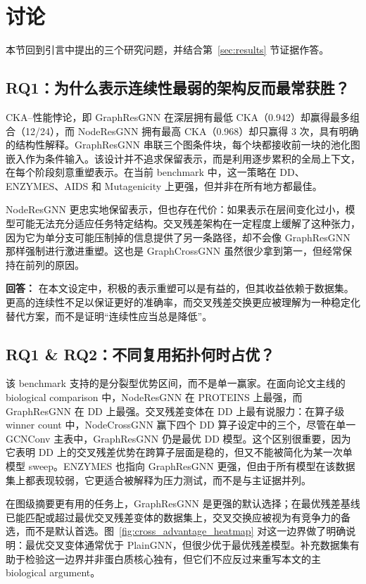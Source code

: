 \section{讨论}

本节回到引言中提出的三个研究问题，并结合第~\ref{sec:results} 节证据作答。

\subsection{RQ1：为什么表示连续性最弱的架构反而最常获胜？}

CKA--性能悖论，即 GraphResGNN 在深层拥有最低 CKA（0.942）却赢得最多组合（12/24），而 NodeResGNN 拥有最高 CKA（0.968）却只赢得 3 次，具有明确的结构性解释。GraphResGNN 串联三个图条件块，每个块都接收前一块的池化图嵌入作为条件输入。该设计并不追求保留表示，而是利用逐步累积的全局上下文，在每个阶段刻意重塑表示。在当前 benchmark 中，这一策略在 DD、ENZYMES、AIDS 和 Mutagenicity 上更强，但并非在所有地方都最佳。

NodeResGNN 更忠实地保留表示，但也存在代价：如果表示在层间变化过小，模型可能无法充分适应任务特定结构。交叉残差架构在一定程度上缓解了这种张力，因为它为单分支可能压制掉的信息提供了另一条路径，却不会像 GraphResGNN 那样强制进行激进重塑。这也是 GraphCrossGNN 虽然很少拿到第一，但经常保持在前列的原因。

\textbf{回答：} 在本文设定中，积极的表示重塑可以是有益的，但其收益依赖于数据集。更高的连续性不足以保证更好的准确率，而交叉残差交换更应被理解为一种稳定化替代方案，而不是证明“连续性应当总是降低”。

\subsection{RQ1 \& RQ2：不同复用拓扑何时占优？}

该 benchmark 支持的是分裂型优势区间，而不是单一赢家。在面向论文主线的 biological comparison 中，NodeResGNN 在 PROTEINS 上最强，而 GraphResGNN 在 DD 上最强。交叉残差变体在 DD 上最有说服力：在算子级 winner count 中，NodeCrossGNN 赢下四个 DD 算子设定中的三个，尽管在单一 GCNConv 主表中，GraphResGNN 仍是最优 DD 模型。这个区别很重要，因为它表明 DD 上的交叉残差优势在跨算子层面是稳的，但又不能被简化为某一次单模型 sweep。ENZYMES 也指向 GraphResGNN 更强，但由于所有模型在该数据集上都表现较弱，它更适合被解释为压力测试，而不是与主证据并列。

在图级摘要更有用的任务上，GraphResGNN 是更强的默认选择；在最优残差基线已能匹配或超过最优交叉残差变体的数据集上，交叉交换应被视为有竞争力的备选，而不是默认首选。图~\ref{fig:cross_advantage_heatmap} 对这一边界做了明确说明：最优交叉变体通常优于 PlainGNN，但很少优于最优残差模型。补充数据集有助于检验这一边界并非蛋白质核心独有，但它们不应反过来重写本文的主 biological argument。

